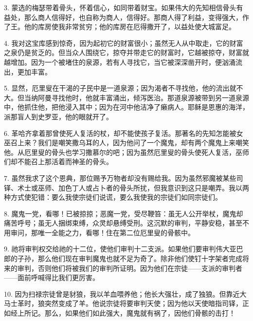 3. 蒙选的梅瑟带着骨头，怀着信心，如同带着财宝。如果伟大的先知相信骨头有益处，那么商人信得好，也自称为商人，信得好。那商人得了利益，变得强大，作了王。他的库房使我非常贫穷；他的库房在厄得撒开了，以益处使大城富足。\par

4. 我对这宝库感到惊奇，因为起初它的财富很小；虽然无人从中取走，它的财富之泉仍是贫乏的。但当众人围绕它，掠夺并带走它的财富时，它越被掠夺，财富就越增加。因为一个被堵住的泉源，若有人寻找它，当它被深深凿开时，便汹涌流出，更加丰富。\par

5. 显然，厄里叟在干渴的子民中是一道泉源；因为渴者不寻找他，他的流出就不大。但当纳阿曼寻找他时，他就丰富涌出，倾泻医治。那道泉源被带到另一道泉源中，他抓住他，把他浸入其中；因为在河中他洁净了癞病人。耶稣是恩惠的海洋，派那盲人到史罗亚，他的眼就开了。\par

6. 革哈齐拿着那曾使死人复活的杖，却不能使孩子复活。那著名的先知怎能被女巫召上来？我们是嘲笑撒乌耳的人，因为他问了一个魔鬼，却有两个魔鬼上来嘲笑他。从厄里叟的骨头也学习撒慕尔的吧；因为虽然厄里叟的骨头使死人复活，巫师们却不能召上那活着而神圣的骨头。\par

7. 虽然我求了这个恩典，那位赐予万物者却没有赐给我。因为虽然邪魔被某些司铎、术士或巫师、加色丁人或占卜者的骨头所扰，但我意识到这只是嘲弄。我以两种方式使犯错：要么我使宗徒们说谎，要么我使我的宗徒们如同宗徒们。\par

8. 魔鬼一党，看哪！已被掠掠；恶魔一党，受尽鞭笞：虽无人公开举杖，魔鬼却痛苦呼号；虽无人捆绑束缚，众灵却悬缚受刑。这沉默的审判，平静安稳，甚至不用审问，那唯一全能之力，看哪！住在第二位厄里叟的骨骸中。\par

9. 祂将审判权交给祂的十二位，使他们审判十二支派。如果他们要审判伟大亚巴郎的子孙，那么他们现在审判魔鬼也就不足为奇了。除非他们使钉十字架者完成将来的审判，否则他们将被我们的审判所证明。因为他们在宗徒——支派的审判者——面前呼喊得比我们更厉害。\par

10. 因为扫禄宗徒曾是豺狼，我以羊血喂养他；他长大强壮，成了独狼。但靠近大马士革时，狼突然变成了羊。他说宗徒将要审判天使；因为他以天使暗指司铎，正如经上所记。那么，如果他们如此强大，魔鬼就有祸了，因他们骨骸的击打！\par


